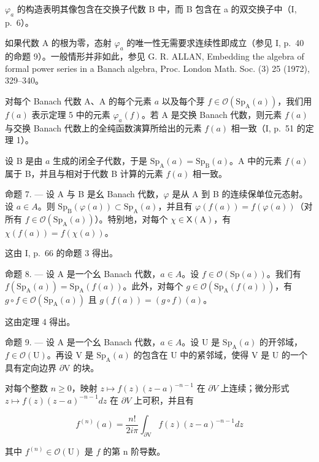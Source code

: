 \(\varphi_{a}\) 的构造表明其像包含在交换子代数 B 中，而 B 包含在 a 的双交换子中（I, p.~6）。

如果代数 A 的根为零，态射 \(\varphi_{a}\) 的唯一性无需要求连续性即成立（参见 I, p.~40 的命题 9）。一般情形并非如此，参见 G. R. ALLAN, Embedding the algebra of formal power series in a Banach algebra, Proc. London Math. Soc. (3) 25 (1972), 329--340。

对每个 Banach 代数 A、A 的每个元素 \(a\) 以及每个芽 \(f \in \mathcal{O}(\mathrm{Sp}_{\mathrm{A}}(a))\)，我们用 \(f(a)\) 表示定理 5 中的元素 \(\varphi_{a}(f)\)。若 A 是交换 Banach 代数，则元素 \(f(a)\) 与交换 Banach 代数上的全纯函数演算所给出的元素 \(f(a)\) 相一致（I, p.~51 的定理 1）。

设 B 是由 \(a\) 生成的闭全子代数，于是 \(\mathrm{Sp}_{\mathrm{A}}(a) = \mathrm{Sp}_{\mathrm{B}}(a)\)。A 中的元素 \(f(a)\) 属于 B，并且与相对于代数 B 计算的元素 \(f(a)\) 相一致。

命题 7. --- 设 A 与 B 是幺 Banach 代数，\(\varphi\) 是从 A 到 B 的连续保单位元态射。设 \(a \in A\)。则 \(\mathrm{Sp}_{\mathrm{B}}(\varphi(a)) \subset \mathrm{Sp}_{\mathrm{A}}(a)\)，并且有 \(\varphi(f(a)) = f(\varphi(a))\)（对所有 \(f \in \mathcal{O}(\mathrm{Sp}_{\mathrm{A}}(a))\)）。特别地，对每个 \(\chi \in \mathsf{X}(\mathrm{A})\)，有 \(\chi(f(a)) = f(\chi(a))\)。

这由 I, p.~66 的命题 3 得出。

命题 8. --- 设 A 是一个幺 Banach 代数，\(a \in A\)。设 \(f \in \mathcal{O}(\mathrm{Sp}(a))\)。我们有 \(f(\mathrm{Sp}_{\mathrm{A}}(a)) = \mathrm{Sp}_{\mathrm{A}}(f(a))\)。此外，对每个 \(g \in \mathcal{O}(\mathrm{Sp}_{\mathrm{A}}(f(a)))\)，有 \(g \circ f \in \mathcal{O}(\mathrm{Sp}_{\mathrm{A}}(a))\) 且 \(g(f(a)) = (g \circ f)(a)\)。

这由定理 4 得出。

命题 9. --- 设 A 是一个幺 Banach 代数，\(a \in A\)。设 U 是 \(\mathrm{Sp}_{\mathrm{A}}(a)\) 的开邻域，\(f \in \mathcal{O}(\mathrm{U})\)。再设 V 是 \(\mathrm{Sp}_{\mathrm{A}}(a)\) 的包含在 U 中的紧邻域，使得 V 是 U 的一个具有定向边界 \(\partial\mathrm{V}\) 的块。

对每个整数 \(n \geqslant 0\)，映射 \(z \mapsto f(z)(z - a)^{-n-1}\) 在 \(\partial V\) 上连续；微分形式 \(z \mapsto f(z)(z - a)^{-n-1} dz\) 在 \(\partial V\) 上可积，并且有

\[
f ^ {(n)} (a) = \frac {n !}{2 i \pi} \int_ {\partial \mathrm{V}} f (z) (z - a) ^ {- n - 1} d z\tag{7}
\]

其中 \(f^{(n)}\in\mathcal{O}(\mathrm{U})\) 是 \(f\) 的第 n 阶导数。

